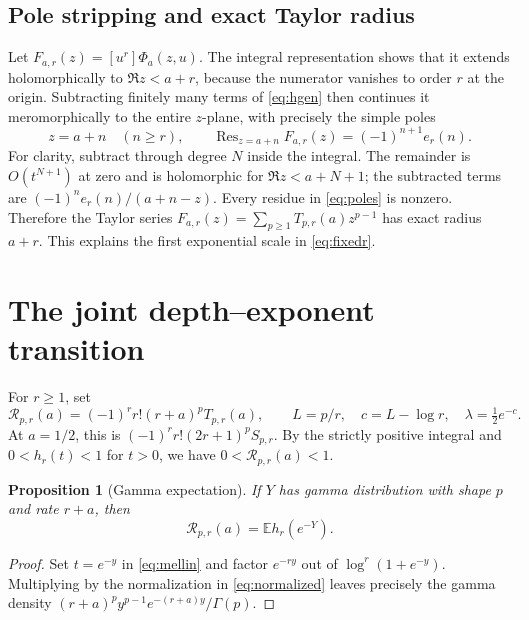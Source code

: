 \documentclass[11pt]{article}
\numberwithin{equation}{section}
\newtheorem{proposition}[theorem]{Proposition}
\theoremstyle{definition}\newtheorem{definition}[theorem]{Definition}
\theoremstyle{remark}\newtheorem{remark}[theorem]{Remark}
\DeclareMathOperator{\Res}{Res}
\newcommand{\E}{\mathbb E}\newcommand{\ii}{\mathrm i}
\begin{document}
\subsection{Pole stripping and exact Taylor radius}
Let $F_{a,r}(z)=[u^r]\Phi_a(z,u)$. The integral representation shows that it extends holomorphically to $\Re z<a+r$, because the numerator vanishes to order $r$ at the origin. Subtracting finitely many terms of \eqref{eq:hgen} then continues it meromorphically to the entire $z$-plane, with precisely the simple poles
\begin{equation}\label{eq:poles}
 z=a+n\quad(n\ge r),\qquad
 \Res_{z=a+n}F_{a,r}(z)=(-1)^{n+1}e_r(n).
\end{equation}
For clarity, subtract through degree $N$ inside the integral. The remainder is $O(t^{N+1})$ at zero and is holomorphic for $\Re z<a+N+1$; the subtracted terms are $(-1)^ne_r(n)/(a+n-z)$. Every residue in \eqref{eq:poles} is nonzero. Therefore the Taylor series
$F_{a,r}(z)=\sum_{p\ge1}T_{p,r}(a)z^{p-1}$ has exact radius $a+r$. This explains the first exponential scale in \eqref{eq:fixedr}.

\section{The joint depth--exponent transition}
\label{sec:transition}

For $r\ge1$, set
\begin{equation}\label{eq:normalized}
 \mathcal R_{p,r}(a)=(-1)^r r!(r+a)^pT_{p,r}(a),
 \qquad L=p/r,\quad c=L-\log r,\quad\lambda=\tfrac12e^{-c}.
\end{equation}
At $a=1/2$, this is $(-1)^r r!(2r+1)^pS_{p,r}$. By the strictly positive integral and $0<h_r(t)<1$ for $t>0$, we have $0<\mathcal R_{p,r}(a)<1$.

\begin{proposition}[Gamma expectation]\label{prop:gammaLaw}
If $Y$ has gamma distribution with shape $p$ and rate $r+a$, then
\begin{equation}\label{eq:gammaLaw}
 \mathcal R_{p,r}(a)=\E h_r(e^{-Y}).
\end{equation}
\end{proposition}
\begin{proof}
Set $t=e^{-y}$ in \eqref{eq:mellin} and factor $e^{-ry}$ out of $\log^r(1+e^{-y})$. Multiplying by the normalization in \eqref{eq:normalized} leaves precisely the gamma density
$(r+a)^p y^{p-1}e^{-(r+a)y}/\Gamma(p)$.
\end{proof}
\end{document}

